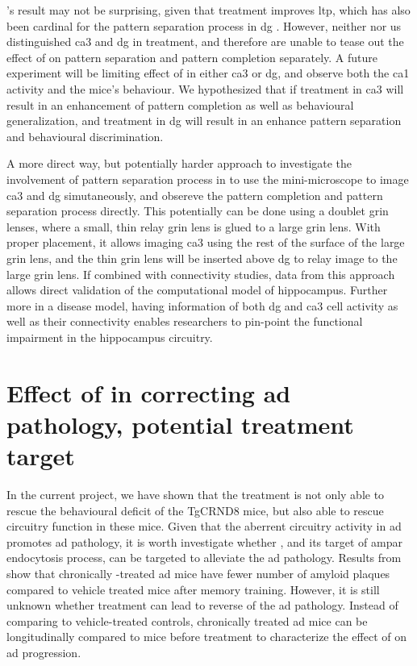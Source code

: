 \citet{migues16}'s result may not be surprising, given that \tglu treatment improves \gls{ltp}, which has also been cardinal for the pattern separation process in \gls{dg} \citep{rolls13}. However, neither \citet{migues16} nor us distinguished \gls{ca3} and \gls{dg} in \tglu treatment, and therefore are unable to tease out the effect of \tglu on pattern separation and pattern completion separately. A future experiment will be limiting effect of \tglu in either \gls{ca3} or \gls{dg}, and observe both the \gls{ca1} activity and the mice's behaviour. We hypothesized that if \tglu treatment in \gls{ca3} will result in an enhancement of pattern completion as well as behavioural generalization, and treatment in \gls{dg} will result in an enhance pattern separation and behavioural discrimination. 

A more direct way, but potentially harder approach to investigate the involvement of pattern separation process in to use the mini-microscope to image \gls{ca3} and \gls{dg} simutaneously, and obsereve the pattern completion and pattern separation process directly. This potentially can be done using a doublet \gls{grin} lenses, where a small, thin relay \gls{grin} lens is glued to a large \gls{grin} lens. With proper placement, it allows imaging \gls{ca3} using the rest of the surface of the large \gls{grin} lens, and the thin \gls{grin} lens will be inserted above \gls{dg} to relay image to the large \gls{grin} lens. If combined with connectivity studies, data from this approach allows direct validation of the computational model of hippocampus. Further more in a disease model, having information of both \gls{dg} and \gls{ca3} cell activity as well as their connectivity enables researchers to pin-point the functional impairment in the hippocampus circuitry.


\section{Effect of \tglu in correcting \gls{ad} pathology, potential treatment target}

In the current project, we have shown that the \tglu treatment is not only able to rescue the behavioural deficit of the TgCRND8 mice, but also able to rescue circuitry function in these mice. Given that the aberrent circuitry activity in \gls{ad} promotes \gls{ad} pathology, it is worth investigate whether \tglu, and its target of \gls{ampar} endocytosis process, can be targeted to alleviate the \gls{ad} pathology. Results from \citet{dong14} show that chronically \tglu-treated \gls{ad} mice have fewer number of amyloid plaques compared to vehicle treated mice after memory training. However, it is still unknown whether \tglu treatment can lead to reverse of the \gls{ad} pathology. Instead of comparing to vehicle-treated controls, chronically treated \gls{ad} mice can be longitudinally compared to mice before treatment to characterize the effect of \tglu on \gls{ad} progression.

